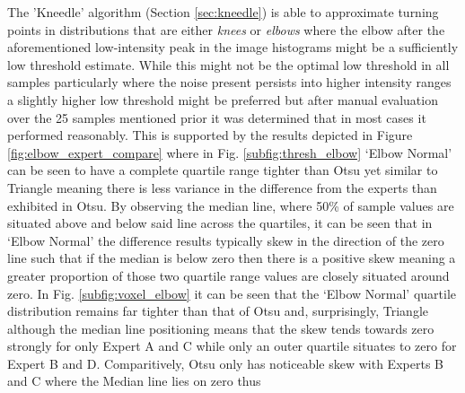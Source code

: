 The 'Kneedle' algorithm (Section \ref{sec:kneedle}) is able to approximate turning points in distributions that are either \textit{knees} or \textit{elbows} where the elbow after the aforementioned low-intensity peak in the image histograms might be a sufficiently low threshold estimate. While this might not be the optimal low threshold in all samples particularly where the noise present persists into higher intensity ranges a slightly higher low threshold might be preferred but after manual evaluation over the 25 samples mentioned prior it was determined that in most cases it performed reasonably. This is supported by the results depicted in Figure \ref{fig:elbow_expert_compare} where in Fig. \ref{subfig:thresh_elbow} `Elbow Normal' can be seen to have a complete quartile range tighter than Otsu yet similar to Triangle meaning there is less variance in the difference from the experts than exhibited in Otsu. By observing the median line, where 50\% of sample values are situated above and below said line across the quartiles, it can be seen that in `Elbow Normal' the difference results typically skew in the direction of the zero line such that if the median is below zero then there is a positive skew meaning a greater proportion of those two quartile range values are closely situated around zero. In Fig. \ref{subfig:voxel_elbow} it can be seen that the `Elbow Normal' quartile distribution remains far tighter than that of Otsu and, surprisingly, Triangle although the median line positioning means that the skew tends towards zero strongly for only Expert A and C while only an outer quartile situates to zero for Expert B and D. Comparitively, Otsu only has noticeable skew with Experts B and C where the Median line lies on zero thus 
\fi
